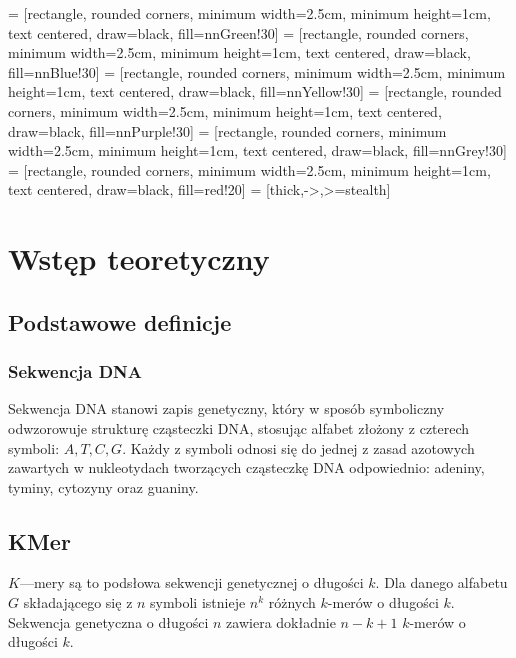 
 = [rectangle, rounded corners, minimum width=2.5cm, minimum height=1cm, text centered, draw=black, fill=nnGreen!30]
 = [rectangle, rounded corners, minimum width=2.5cm, minimum height=1cm, text centered, draw=black, fill=nnBlue!30]
 = [rectangle, rounded corners, minimum width=2.5cm, minimum height=1cm, text centered, draw=black, fill=nnYellow!30]
 = [rectangle, rounded corners, minimum width=2.5cm, minimum height=1cm, text centered, draw=black, fill=nnPurple!30]
 = [rectangle, rounded corners, minimum width=2.5cm, minimum height=1cm, text centered, draw=black, fill=nnGrey!30]
 = [rectangle, rounded corners, minimum width=2.5cm, minimum height=1cm, text centered, draw=black, fill=red!20]
 = [thick,->,>=stealth]

\clearpage
\section{Wstęp teoretyczny}

    \subsection{Podstawowe definicje}

        \subsubsection{Sekwencja DNA}

            Sekwencja DNA stanowi zapis genetyczny, który w sposób symboliczny odwzorowuje strukturę cząsteczki DNA, stosując alfabet złożony z czterech symboli: $A, T, C, G$. Każdy z symboli odnosi się do jednej z zasad azotowych zawartych w nukleotydach tworzących cząsteczkę DNA odpowiednio: adeniny, tyminy, cytozyny oraz guaniny.

            \subsection{KMer}
        
            $K$—mery są to podsłowa sekwencji genetycznej o długości $k$. Dla danego alfabetu $G$ składającego się z $n$ symboli istnieje $n^k$ różnych $k$-merów o długości $k$. Sekwencja genetyczna o długości $n$ zawiera dokładnie $n - k + 1$ $k$-merów o długości $k$.

